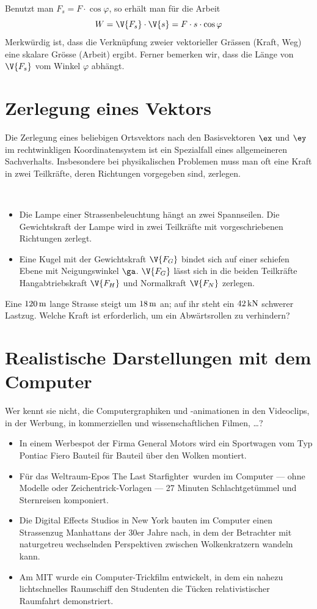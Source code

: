 \documentclass[%
11pt,%
twoside,%
titlepage,%
german,%
headsepline%
]{scrartcl}
\theoremstyle{definition}
\theoremstyle{plain}
\begin{document}
Benutzt man $F_s = F\cdot\cos\varphi$, so erhält man für die Arbeit
$$W = \V{F_s}\cdot\V{s} = F\cdot s \cdot \cos \varphi$$
Merkwürdig ist, dass die Verknüpfung zweier vektorieller Grässen (Kraft, Weg) eine skalare Grösse (Arbeit) ergibt. Ferner bemerken wir, dass die Länge von $\V{F_s}$ vom Winkel $\varphi$ abhängt.

\section{Zerlegung eines Vektors}
Die Zerlegung eines beliebigen Ortsvektors nach den Basisvektoren $\ex$ und $\ey$ im rechtwinkligen Koordinatensystem ist ein Spezialfall eines allgemeineren Sachverhalts. Insbesondere bei physikalischen Problemen muss man oft eine Kraft in zwei Teilkräfte, deren Richtungen vorgegeben sind, zerlegen.

\begin{bsps}
\ \\[-4ex]
\begin{itemize}
\item Die Lampe einer Strassenbeleuchtung hängt an zwei Spannseilen. Die Gewichtskraft der Lampe wird in zwei Teilkräfte mit vorgeschriebenen Richtungen zerlegt.
\item Eine Kugel mit der Gewichtskraft $\V{F_G}$ bindet sich auf einer schiefen Ebene mit Neigungswinkel $\ga$. $\V{F_G}$ lässt sich in die beiden Teilkräfte Hangabtriebskraft $\V{F_H}$ und Normalkraft $\V{F_N}$ zerlegen.
\end{itemize}
\end{bsps}

\begin{ueb}
Eine $\unit[120]{m}$ lange Strasse steigt um $\unit[18]{m}$ an; auf ihr steht ein $\unit[42]{kN}$ schwerer Lastzug. Welche Kraft ist erforderlich, um ein Abwärtsrollen zu verhindern?
\end{ueb}
\section{Realistische Darstellungen mit dem Computer}
Wer kennt sie nicht, die Computergraphiken und -animationen in den Videoclips, in der Werbung, in kommerziellen und wissenschaftlichen Filmen, \dots?

\begin{itemize}
\item In einem Werbespot der Firma General Motors wird ein Sportwagen vom Typ Pontiac Fiero Bauteil für Bauteil über den Wolken montiert.
\item Für das Weltraum-Epos \glqq The Last Starfighter\grqq\ wurden im Computer --- ohne Modelle oder Zeichentrick-Vorlagen --- 27 Minuten Schlachtgetümmel und Sternreisen komponiert.
\item Die Digital Effects Studios in New York bauten im Computer einen Strassenzug Manhattans der 30er Jahre nach, in dem der Betrachter mit naturgetreu wechselnden Perspektiven zwischen Wolkenkratzern wandeln kann.
\item Am MIT wurde ein Computer-Trickfilm entwickelt, in dem ein nahezu lichtschnelles Raumschiff den Studenten die Tücken relativistischer Raumfahrt demonstriert.
\end{itemize}
\end{document}
